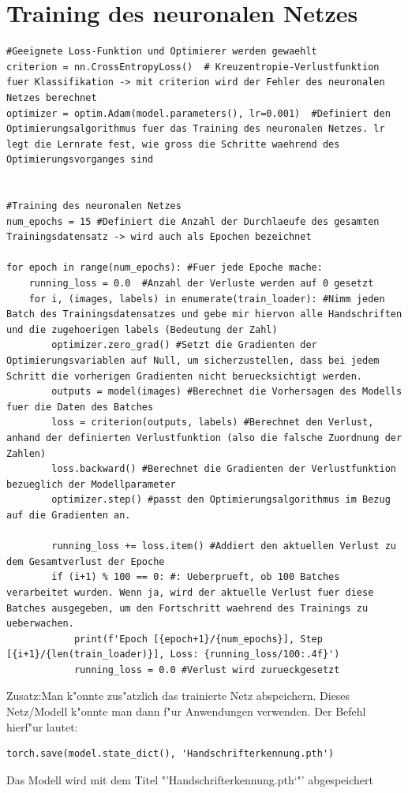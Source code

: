 \documentclass[a4paper,11pt,titlepage]{article}
\begin{document}
\section{Training des neuronalen Netzes}
\begin{lstlisting}[style = python]
#Geeignete Loss-Funktion und Optimierer werden gewaehlt
criterion = nn.CrossEntropyLoss()  # Kreuzentropie-Verlustfunktion fuer Klassifikation -> mit criterion wird der Fehler des neuronalen Netzes berechnet
optimizer = optim.Adam(model.parameters(), lr=0.001)  #Definiert den Optimierungsalgorithmus fuer das Training des neuronalen Netzes. lr legt die Lernrate fest, wie gross die Schritte waehrend des Optimierungsvorganges sind


#Training des neuronalen Netzes
num_epochs = 15 #Definiert die Anzahl der Durchlaeufe des gesamten Trainingsdatensatz -> wird auch als Epochen bezeichnet

for epoch in range(num_epochs): #Fuer jede Epoche mache:
    running_loss = 0.0  #Anzahl der Verluste werden auf 0 gesetzt
    for i, (images, labels) in enumerate(train_loader): #Nimm jeden Batch des Trainingsdatensatzes und gebe mir hiervon alle Handschriften und die zugehoerigen labels (Bedeutung der Zahl)
        optimizer.zero_grad() #Setzt die Gradienten der Optimierungsvariablen auf Null, um sicherzustellen, dass bei jedem Schritt die vorherigen Gradienten nicht beruecksichtigt werden.
        outputs = model(images) #Berechnet die Vorhersagen des Modells fuer die Daten des Batches
        loss = criterion(outputs, labels) #Berechnet den Verlust, anhand der definierten Verlustfunktion (also die falsche Zuordnung der Zahlen)
        loss.backward() #Berechnet die Gradienten der Verlustfunktion bezueglich der Modellparameter
        optimizer.step() #passt den Optimierungsalgorithmus im Bezug auf die Gradienten an.

        running_loss += loss.item() #Addiert den aktuellen Verlust zu dem Gesamtverlust der Epoche
        if (i+1) % 100 == 0: #: Ueberprueft, ob 100 Batches verarbeitet wurden. Wenn ja, wird der aktuelle Verlust fuer diese Batches ausgegeben, um den Fortschritt waehrend des Trainings zu ueberwachen.
            print(f'Epoch [{epoch+1}/{num_epochs}], Step [{i+1}/{len(train_loader)}], Loss: {running_loss/100:.4f}')
            running_loss = 0.0 #Verlust wird zurueckgesetzt
\end{lstlisting}
Zusatz:Man k"onnte zus"atzlich das trainierte Netz abspeichern. Dieses Netz/Modell k"onnte man dann f"ur Anwendungen verwenden. Der Befehl hierf"ur lautet:
\begin{lstlisting}[style = python]
torch.save(model.state_dict(), 'Handschrifterkennung.pth')
\end{lstlisting}
Das Modell wird mit dem Titel "'Handschrifterkennung.pth`"' abgespeichert
\end{document}
